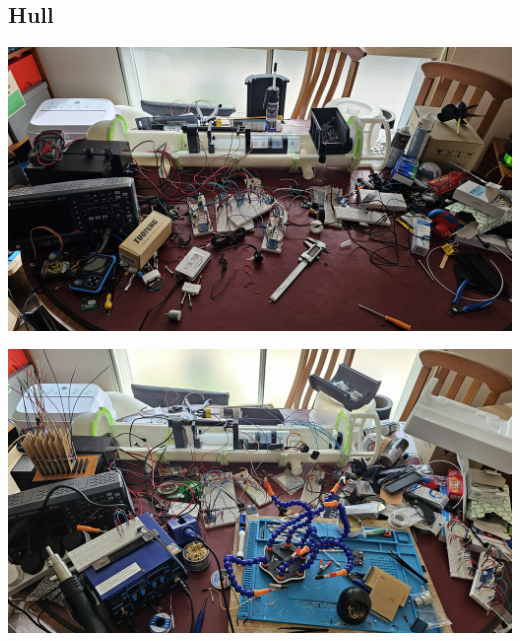\documentclass[11pt,a4paper,titlepage]{report}
\begin{document}
	\subsection{Hull}\label{appendix:images_development}
	\begin{center}
		\label{picture:images_development_1}
		\includegraphics[width=\linewidth]{assets/AUV_ModuleDevelopment1.jpg}
	\end{center}
	\begin{center}
		\label{picture:images_development_2}
		\includegraphics[width=\linewidth]{assets/AUV_ModuleDevelopment2.jpg}
	\end{center}
	
\end{document}
